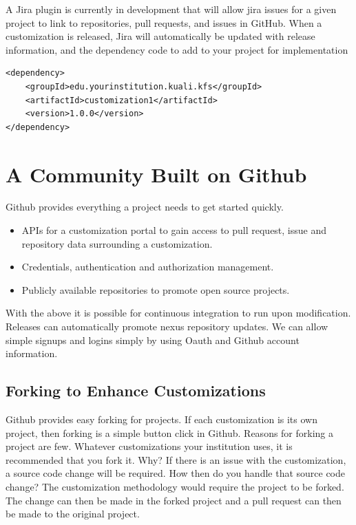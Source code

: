 \documentclass[12pt]{report}
\begin{document}
A Jira plugin is currently in development that will allow jira issues for a given project to link to repositories, pull requests, 
and issues in GitHub. When a customization is released, Jira will automatically be updated with release information, and the dependency
code to add to your project for implementation

\begin{verbatim}
<dependency>
    <groupId>edu.yourinstitution.kuali.kfs</groupId>
    <artifactId>customization1</artifactId>
    <version>1.0.0</version>
</dependency>
\end{verbatim}

\section{A Community Built on Github}

Github provides everything a project needs to get started quickly. 
\begin{itemize}
  \item APIs for a customization portal to gain access to pull request, issue and repository data surrounding a customization.
  \item Credentials, authentication and authorization management.
  \item Publicly available repositories to promote open source projects.
\end{itemize}

With the above it is possible for continuous integration to run upon modification. Releases can automatically promote nexus repository
updates. We can allow simple signups and logins simply by using Oauth and Github account information.

\subsection{Forking to Enhance Customizations}

Github provides easy forking for projects. If each customization is its own project, then forking is a simple button click in Github. 
Reasons for forking a project are few. Whatever customizations your institution uses, it is recommended that you fork it. Why? If 
there is an issue with the customization, a source code change will be required. How then do you handle that source code change? The
customization methodology would require the project to be forked. The change can then be made in the forked project and a pull
request can then be made to the original project. 
\end{document}

